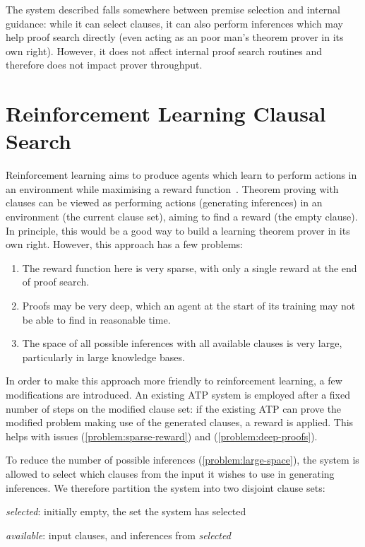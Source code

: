 \documentclass[twocolumn,a4paper,10pt]{article}
\begin{document}
The system described falls somewhere between premise selection and internal guidance: while it can select clauses, it can also perform inferences which may help proof search directly (even acting as an poor man's theorem prover in its own right).
However, it does not affect internal proof search routines and therefore does not impact prover throughput.

\section{Reinforcement Learning Clausal Search}
Reinforcement learning aims to produce agents which learn to perform actions in an environment while maximising a reward function~\cite{reinforcement}.
Theorem proving with clauses can be viewed as performing actions (generating inferences) in an environment (the current clause set), aiming to find a reward (the empty clause).
In principle, this would be a good way to build a learning theorem prover in its own right.
However, this approach has a few problems:
\begin{enumerate}
	\item\label{problem:sparse-reward} The reward function here is very sparse, with only a single reward at the end of proof search.
	\item\label{problem:deep-proofs} Proofs may be very deep, which an agent at the start of its training may not be able to find in reasonable time.
	\item\label{problem:large-space} The space of all possible inferences with all available clauses is very large, particularly in large knowledge bases.
\end{enumerate}
In order to make this approach more friendly to reinforcement learning, a few modifications are introduced.
An existing ATP system is employed after a fixed number of steps on the modified clause set: if the existing ATP can prove the modified problem making use of the generated clauses, a reward is applied.
This helps with issues (\ref{problem:sparse-reward}) and (\ref{problem:deep-proofs}).

To reduce the number of possible inferences (\ref{problem:large-space}), the system is allowed to select which clauses from the input it wishes to use in generating inferences.
We therefore partition the system into two disjoint clause sets:
\begin{description}
	\item\emph{selected}: initially empty, the set the system has selected
	\item\emph{available}: input clauses, and inferences from \emph{selected}
\end{description}
\end{document}
